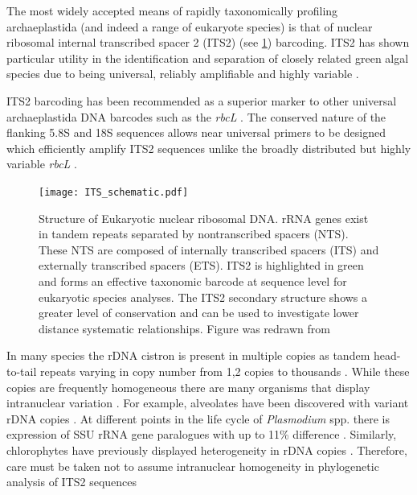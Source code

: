 The most widely accepted means of rapidly taxonomically profiling
archaeplastida (and indeed a range of eukaryote species) is that of 
nuclear ribosomal internal transcribed spacer 2 (ITS2) (see \cref{fig:its2_schematic}) barcoding. 
ITS2 has shown particular utility in the identification and separation
of closely related green algal species \citep{Buchheim2011,Heeg2015} due to being
universal, reliably amplifiable and highly variable \citep{Hershkovitz1996}.

ITS2 barcoding has been recommended as a superior marker to 
other universal archaeplastida DNA barcodes such as the \textit{rbcL} 
\citep{Chen2010}.  The conserved nature of the flanking 5.8S and
18S sequences allows near universal primers to be designed which efficiently 
amplify ITS2 sequences unlike the broadly distributed but
highly variable \textit{rbcL} \citep{Buchheim2011}.

\begin{figure}[h]
    \texttt{[image: ITS\_schematic.pdf]}
    \caption[ITS2 structure overview]{Structure of Eukaryotic nuclear ribosomal DNA.
        rRNA genes exist in tandem repeats separated by nontranscribed spacers (NTS).
        These NTS are composed of internally transcribed spacers (ITS) and externally
        transcribed spacers (ETS).
        ITS2 is highlighted in green and forms an effective taxonomic barcode at sequence level 
        for eukaryotic species analyses.  The ITS2 secondary structure
        shows a greater level of conservation and can be used to investigate
        lower distance systematic relationships.  Figure was redrawn from \citep{Shi2005}}
\label{fig:its2_schematic}
\end{figure}

In many species the rDNA cistron is present in multiple copies
as tandem head-to-tail repeats varying in copy number from 1,2 copies
to thousands \citep{Torres-Machorro2010}.  While these copies are
frequently homogeneous there are many organisms that display
intranuclear variation \citep{Buchheim2011}.
For example, alveolates have been discovered with variant 
rDNA copies \citep{Stern2012,Galluzzi2004}. At 
different points in the life cycle of \textit{Plasmodium} spp. \citep{Nishimoto2008}
there is expression of SSU rRNA gene paralogues with up to 11\%
difference \citep{McCutchan1988,Chambouvet2015}.
Similarly, chlorophytes have previously displayed 
heterogeneity in rDNA copies \citep{Pillmann1997,Fama2000}.
Therefore, care must be taken not to assume intranuclear
homogeneity in phylogenetic analysis of ITS2 sequences \citep{Buchheim2011}


